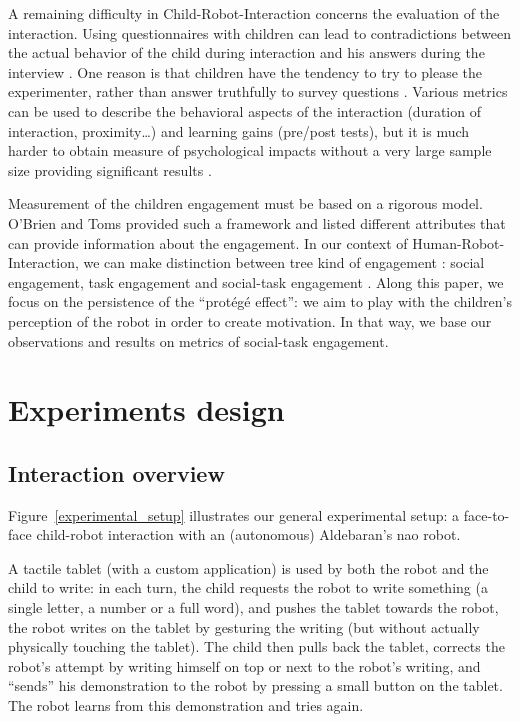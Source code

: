 \documentclass[conference]{IEEEtran}
\begin{document}
A remaining difficulty in Child-Robot-Interaction concerns the evaluation of the interaction. Using questionnaires with children can lead to contradictions between the actual behavior of the child during interaction and his answers during the interview \cite{lemaignan2015youre}. One reason is that children have the tendency to try to please the experimenter, rather than answer truthfully to survey questions \cite{belpaeme2013child}. Various metrics can be used to describe the behavioral aspects of the interaction (duration of interaction, proximity\ldots) and learning gains (pre/post tests), but it is much harder to obtain measure of psychological impacts without a very large sample size providing significant results \cite{belpaeme2013child}. 

Measurement of the children engagement must be based on a rigorous model. O'Brien and Toms \cite{o2008user} provided such a framework and listed different attributes that can provide information about the engagement. In our context of Human-Robot-Interaction, we can make distinction between tree kind of engagement : social engagement, task engagement and social-task engagement \cite{corrigan2013social}. Along this paper, we focus on the persistence of the ``prot\'eg\'e effect'': we aim to play with the children's perception of the robot in order to create motivation. In that way, we base our observations and results on metrics of social-task engagement. 


\section{Experiments design}
\subsection{Interaction overview}
Figure~\ref{experimental_setup} illustrates our general experimental setup: a
face-to-face child-robot interaction with an (autonomous) Aldebaran's {\sc nao}
robot.

A tactile tablet (with a custom application) is used by both the robot and the
child to write: in each turn, the child requests the robot to write
something (a single letter, a number or a full word), and pushes the tablet
towards the robot, the robot writes on the tablet by gesturing the writing (but
without actually physically touching the tablet). The child then pulls back the
tablet, corrects the robot's attempt by writing himself on top or next to
the robot's writing, and ``sends'' his
demonstration to the robot by pressing a small button on the tablet. The robot
learns from this demonstration and tries again.
\end{document}
